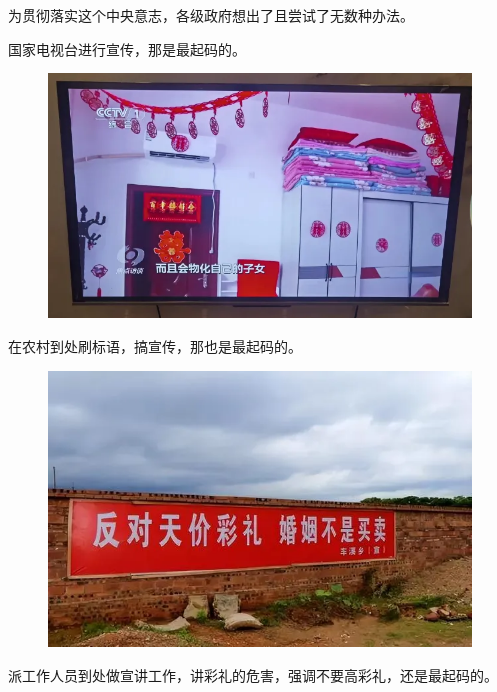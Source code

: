 \documentclass[UTF8,11pt,oneside]{ctexart}
\begin{document}

为贯彻落实这个中央意志，各级政府想出了且尝试了无数种办法。

国家电视台进行宣传，那是最起码的。

\begin{figure}[H]
    \centering
    \includegraphics[width=13cm]{2025-04-17-004.png}
\end{figure}

在农村到处刷标语，搞宣传，那也是最起码的。

\begin{figure}[H]
    \centering
    \includegraphics[width=13cm]{2025-04-17-005.png}
\end{figure}

派工作人员到处做宣讲工作，讲彩礼的危害，强调不要高彩礼，还是最起码的。
\end{document}

